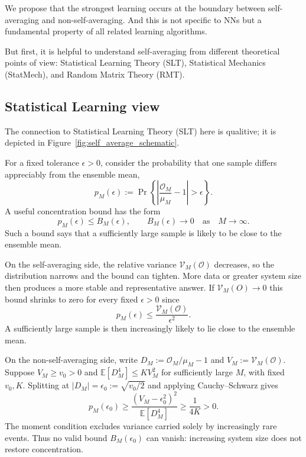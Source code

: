 We propose that  the strongest learning occurs at the
boundary between self-averaging and non-self-averaging.
And this is not specific to NNs but a fundamental
property of all related learning algorithms.

But first, it is helpful to understand self-averaging
from different theoretical points of view:
Statistical Learning Theory (SLT), Statistical Mechanics (StatMech),
and Random Matrix Theory (RMT).

\subsection{Statistical Learning view}
The connection to Statistical Learning Theory (SLT) here is qualitive; it
is depicted in Figure~\ref{fig:self_average_schematic}.

For a fixed tolerance $\epsilon>0$, consider the probability that one sample differs
appreciably from the ensemble mean,
\begin{equation}
p_M(\epsilon)
:=
\Pr\!\left\{
\left|
\frac{\mathcal{O}_M}{\mu_M}-1
\right|>
\epsilon
\right\}.
\end{equation}
A useful concentration bound has the form
\begin{equation}
p_M(\epsilon)\leq B_M(\epsilon),
\qquad
B_M(\epsilon)\longrightarrow0
\quad\text{as}\quad M\longrightarrow\infty .
\end{equation}
Such a bound says that a sufficiently large sample is likely to be close to
the ensemble mean.

On the self-averaging side, the relative variance
$\mathcal V_M(\mathcal{O})$ decreases, so the distribution narrows and the bound can
tighten. More data or greater system size then produces a more stable and
representative answer.
If
$\mathcal{V}_M(O) \to 0$
this bound shrinks to zero for every
fixed $\epsilon>0$ since
\begin{equation}
p_M(\epsilon)
\leq
\frac{\mathcal V_M(\mathcal O)}{\epsilon^2}.
\label{eq:relative_chebyshev}
\end{equation}
 A sufficiently large sample is then increasingly likely
to lie close to the ensemble mean.

On the non-self-averaging side, write $D_M:=\mathcal O_M/\mu_M-1$
and $V_M:=\mathcal V_M(\mathcal O)$. Suppose $V_M\geq v_0>0$ and
$\mathbb E[D_M^4]\leq K V_M^2$ for sufficiently large $M$, with fixed
$v_0,K$. Splitting at $|D_M|=\epsilon_0:=\sqrt{v_0/2}$ and applying
Cauchy--Schwarz gives
\[
p_M(\epsilon_0)\geq
\frac{(V_M-\epsilon_0^2)^2}{\mathbb E[D_M^4]}
\geq\frac{1}{4K}>0.
\]
The moment condition excludes variance carried solely by increasingly rare
events. Thus no valid bound $B_M(\epsilon_0)$ can vanish: increasing system
size does not restore concentration.


